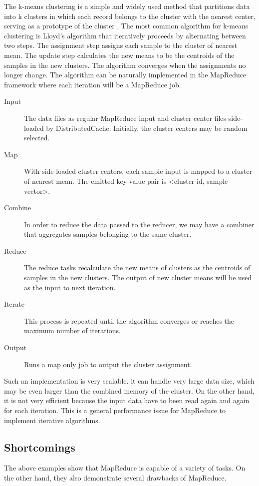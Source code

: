 \documentclass[11pt]{book}
\begin{document}
The k-means clustering is a simple and widely used method that partitions data into k clusters in which each record belongs to the cluster with the nearest center, serving as a prototype of the cluster \cite{Jain:1988:ACD}. The most common algorithm for k-means clustering is Lloyd's algorithm that iteratively proceeds by alternating between two steps. The assignment step assigns each sample to the cluster of nearest mean. The update step calculates the new means to be the centroids of the samples in the new clusters. The algorithm converges when the assignments no longer change. The algorithm can be naturally implemented in the MapReduce framework where each iteration will be a MapReduce job.
\begin{description}
\item[Input] The data files as regular MapReduce input and cluster center files side-loaded by DistributedCache. Initially, the cluster centers may be random selected.
\item[Map] With side-loaded cluster centers, each sample input is mapped to a cluster of nearest mean. The emitted key-value pair is \textless cluster id, sample vector\textgreater.
\item[Combine] In order to reduce the data passed to the reducer, we may have a combiner that aggregates samples belonging to the same cluster.
\item[Reduce] The reduce tasks recalculate the new means of clusters as the centroids of samples in the new clusters. The output of new cluster means will be used as the input to next iteration.
\item[Iterate] This process is repeated until the algorithm converges or reaches the maximum number of iterations.
\item[Output] Runs a map only job to output the cluster assignment.
\end{description}

Such an implementation is very scalable. it can handle very large data size, which may be even larger than the combined memory of the cluster. On the other hand, it is not very efficient because the input data have to been read again and again for each iteration. This is a general performance issue for MapReduce to implement iterative algorithms.
 
\subsection{Shortcomings}
The above examples show that MapReduce is capable of a variety of tasks. On the other hand, they also demonstrate several drawbacks of MapReduce.
\end{document}
